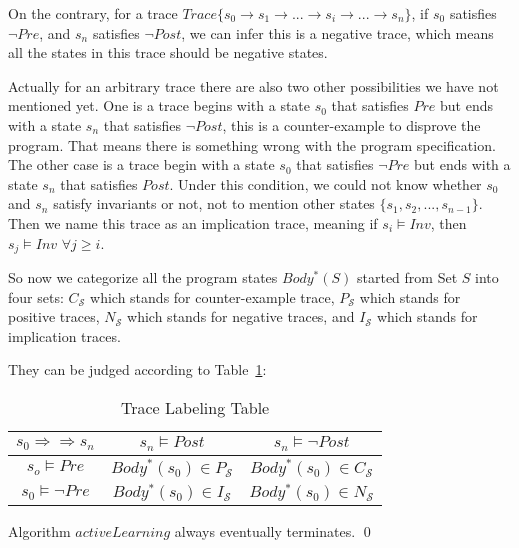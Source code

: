 On the contrary, for a trace $Trace\{s_0 \to s_1 \to ...\to s_i \to ... \to s_n\}$, 
if $s_0$ satisfies $\neg Pre$, and $s_n$ satisfies $\neg Post$,
we can infer this is a negative trace, 
which means all the states in this trace should be negative states.  

Actually for an arbitrary trace there are also two other possibilities we have not mentioned yet.
One is a trace begins with a state $s_0$ that satisfies $Pre$ but ends with a state $s_n$ that satisfies $\neg Post$,
this is a counter-example to disprove the program.
That means there is something wrong with the program specification.
The other case is a trace begin with a state $s_0$ that satisfies $\neg Pre$ but ends with a state $s_n$ that satisfies $Post$.
Under this condition, we could not know whether $s_0$ and $s_n$ satisfy invariants or not,
not to mention other states $\{s_1, s_2, ..., s_{n-1}\}$.
Then we name this trace as an implication trace, meaning if $s_i \models Inv$, then $s_j \models Inv$ $\forall j \ge i$.


So now we categorize all the program states $Body^*(S)$ started from Set $S$ into four sets:
$C_\mathcal{S}$ which stands for counter-example trace, 
$P_\mathcal{S}$ which stands for positive traces, 
$N_\mathcal{S}$ which stands for negative traces, 
and $I_\mathcal{S}$ which stands for implication traces.

They can be judged according to Table~\ref{LabelingTable}: 
\begin{table}[htb]
\label{LabelingTable}
\centering
\caption{Trace Labeling Table}
\begin{tabular}[float]{|c|c|c|}
\hline
$s_0 \Rightarrow \Rightarrow s_n$ & $s_n \models Post$            & $s_n \models \neg Post$\\
\hline
$s_o \models Pre$                 & $Body^*(s_0) \in P_\mathcal{S}$       & $Body^*(s_0) \in C_\mathcal{S}$\\
\hline
$s_0 \models \neg Pre$            & $Body^*(s_0) \in I_\mathcal{S}$       & $Body^*(s_0) \in N_\mathcal{S}$\\
\hline
\end{tabular}
\end{table}










\begin{example}
\end{example}

\begin{proposition}
Algorithm $activeLearning$ always eventually terminates. \hfill \qed
\end{proposition}

